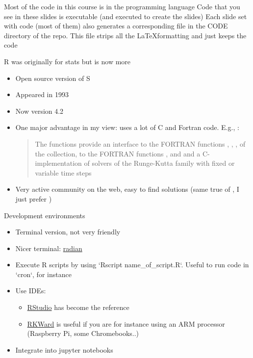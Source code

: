 \documentclass[aspectratio=169]{beamer}\usepackage[]{graphicx}\usepackage[]{xcolor}
\begin{document}
\begin{frame}
	Most of the code in this course is in the  programming language
	\vfill
	Code that you see in these slides is executable (and executed to create the slides)
	\vfill
	Each slide set with code (most of them) also generates a corresponding  file in the CODE directory of the repo. This file strips all the \LaTeX formatting and just keeps the  code
\end{frame}

\begin{frame}{R was originally for stats but is now more}
\begin{itemize}
\item Open source version of S \vfill
\item Appeared in 1993 \vfill
\item Now version 4.2 \vfill
\item One major advantage in my view: uses a lot of C and Fortran code. E.g., :
\begin{quote}
    The functions provide an interface to the FORTRAN functions , , ,  of the  collection, to the FORTRAN functions ,  and  and a C-implementation of solvers of the Runge-Kutta family with fixed or variable time steps  
\end{quote} \vfill
\item Very active community on the web, easy to find solutions (same true of , I just prefer )
\end{itemize}
\end{frame} 

\begin{frame}{Development environments}
\begin{itemize}
    \item Terminal version, not very friendly \vfill
    \item Nicer terminal: \href{https://github.com/randy3k/radian}{radian} \vfill
    \item Execute R scripts by using `Rscript name\_of\_script.R`. Useful to run code in `cron`, for instance \vfill
    \item Use IDEs:
    \begin{itemize}
        \item \href{https://www.rstudio.com/products/rstudio/}{RStudio} has become the reference
        \item \href{https://invent.kde.org/education/rkward}{RKWard} is useful if you are for instance using an ARM processor (Raspberry Pi, some Chromebooks..)
    \end{itemize} \vfill
    \item Integrate into jupyter notebooks
\end{itemize}
\end{frame} 
\end{document}

